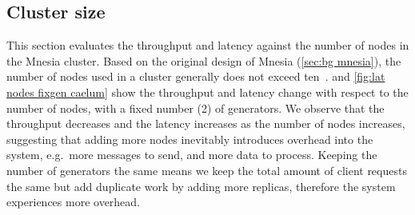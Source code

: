 \subsection{Cluster size} \label{subsec:eval cluster size}

This section evaluates the throughput and latency against the number of nodes in the 
Mnesia cluster. Based on the original design of Mnesia (\cref{sec:bg mnesia}), 
the number of nodes used in a cluster generally does not exceed ten~\cite{hebert2013LYSE}.
 and \cref{fig:lat nodes fixgen caelum} show the 
throughput and latency change with respect to
the number of nodes, with a fixed number (2) of generators. We observe that
the throughput decreases and the latency increases as the number of nodes increases,
suggesting that adding more nodes inevitably introduces overhead into the system,
e.g.\ more messages to send, and more data to process. Keeping the number of
generators the same means we keep the total amount of client requests
the same but add duplicate work by adding more replicas, therefore the system
experiences more overhead.


